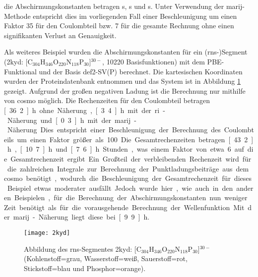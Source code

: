 die Abschirmungskonstanten betragen \unit[4610]{s}, \unit[741]{s} und \unit[633]{s}. Unter Verwendung der \ac{marij}-Methode entspricht dies im vorliegenden Fall einer Beschleunigung um einen Faktor 35 für den Coulombteil bzw. 7 für die gesamte Rechnung ohne einen signifikanten Verlust an Genauigkeit. 

Als weiteres Beispiel wurden die Abschirmungskonstanten für ein \mbox{(\acs{rns}-)}Segment (2kyd\supercite{2kydstructure}: [C$_{304}$H$_{346}$O$_{220}$N$_{118}$P$_{30}$]$^{30-}$, 10220 Basisfunktionen) mit dem PBE-Funktional und der Basis def2-SV(P) berechnet. Die kartesischen Koordinaten wurden der Proteindatenbank entnommen und das System ist in Abbildung \ref{abb:2kyd} gezeigt. Aufgrund der großen negativen Ladung ist die Berechnung nur mithilfe von \ac{cosmo} möglich. Die Rechenzeiten für den Coulombteil betragen \unit[36.2]{h} ohne Näherung, \unit[3.4]{h} mit der \ac{ri}-Näherung und \unit[0.3]{h} mit der \ac{marij}-Näherung. Dies entspricht einer Beschleunigung der Berechnung des Coulombteils um einen Faktor größer als 100. Die Gesamtrechenzeiten betragen \unit[43.2]{h}, \unit[10.7]{h} und \unit[7.6]{h} Stunden, was einem Faktor von etwa 6 auf die Gesamtrechenzeit ergibt. Ein Großteil der verbleibenden Rechenzeit wird für die zahlreichen Integrale zur Berechnung der Punktladungsbeiträge aus dem \ac{cosmo} benötigt, wodurch die Beschleunigung der Gesamtrechenzeit für dieses Beispiel etwas moderater ausfällt. Jedoch wurde hier, wie auch in den anderen Beispielen, für die Berechnung der Abschirmungskonstanten nun weniger Zeit benötigt als für die vorausgehende Berechnung der Wellenfunktion. Mit der \ac{marij}-Näherung liegt diese bei \unit[9.9]{h}.

\begin{figure}[ht!]
	\centering
	\texttt{[image: 2kyd]}
	\captionsetup{figurewithin = chapter}
	\captionsetup{font=small, labelfont=bf}\caption[{Abbildung eines \ac{rns}-Segmentes}]{Abbildung des \ac{rns}-Segmentes 2kyd\supercite{2kydstructure}: [C$_{304}$H$_{346}$O$_{220}$N$_{118}$P$_{30}$]$^{30-}$ (Kohlenstoff=grau, Wasserstoff=weiß, Sauerstoff=rot, Stickstoff=blau und Phosphor=orange).}
\label{abb:2kyd}
\end{figure}
\FloatBarrier

